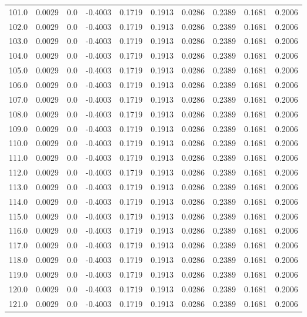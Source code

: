 \begin{longtable}{lrrrrrrrrr}
101.0 & 0.0029 & 0.0 & -0.4003 & 0.1719 & 0.1913 & 0.0286 & 0.2389 & 0.1681 & 0.2006 \\
102.0 & 0.0029 & 0.0 & -0.4003 & 0.1719 & 0.1913 & 0.0286 & 0.2389 & 0.1681 & 0.2006 \\
103.0 & 0.0029 & 0.0 & -0.4003 & 0.1719 & 0.1913 & 0.0286 & 0.2389 & 0.1681 & 0.2006 \\
104.0 & 0.0029 & 0.0 & -0.4003 & 0.1719 & 0.1913 & 0.0286 & 0.2389 & 0.1681 & 0.2006 \\
105.0 & 0.0029 & 0.0 & -0.4003 & 0.1719 & 0.1913 & 0.0286 & 0.2389 & 0.1681 & 0.2006 \\
106.0 & 0.0029 & 0.0 & -0.4003 & 0.1719 & 0.1913 & 0.0286 & 0.2389 & 0.1681 & 0.2006 \\
107.0 & 0.0029 & 0.0 & -0.4003 & 0.1719 & 0.1913 & 0.0286 & 0.2389 & 0.1681 & 0.2006 \\
108.0 & 0.0029 & 0.0 & -0.4003 & 0.1719 & 0.1913 & 0.0286 & 0.2389 & 0.1681 & 0.2006 \\
109.0 & 0.0029 & 0.0 & -0.4003 & 0.1719 & 0.1913 & 0.0286 & 0.2389 & 0.1681 & 0.2006 \\
110.0 & 0.0029 & 0.0 & -0.4003 & 0.1719 & 0.1913 & 0.0286 & 0.2389 & 0.1681 & 0.2006 \\
111.0 & 0.0029 & 0.0 & -0.4003 & 0.1719 & 0.1913 & 0.0286 & 0.2389 & 0.1681 & 0.2006 \\
112.0 & 0.0029 & 0.0 & -0.4003 & 0.1719 & 0.1913 & 0.0286 & 0.2389 & 0.1681 & 0.2006 \\
113.0 & 0.0029 & 0.0 & -0.4003 & 0.1719 & 0.1913 & 0.0286 & 0.2389 & 0.1681 & 0.2006 \\
114.0 & 0.0029 & 0.0 & -0.4003 & 0.1719 & 0.1913 & 0.0286 & 0.2389 & 0.1681 & 0.2006 \\
115.0 & 0.0029 & 0.0 & -0.4003 & 0.1719 & 0.1913 & 0.0286 & 0.2389 & 0.1681 & 0.2006 \\
116.0 & 0.0029 & 0.0 & -0.4003 & 0.1719 & 0.1913 & 0.0286 & 0.2389 & 0.1681 & 0.2006 \\
117.0 & 0.0029 & 0.0 & -0.4003 & 0.1719 & 0.1913 & 0.0286 & 0.2389 & 0.1681 & 0.2006 \\
118.0 & 0.0029 & 0.0 & -0.4003 & 0.1719 & 0.1913 & 0.0286 & 0.2389 & 0.1681 & 0.2006 \\
119.0 & 0.0029 & 0.0 & -0.4003 & 0.1719 & 0.1913 & 0.0286 & 0.2389 & 0.1681 & 0.2006 \\
120.0 & 0.0029 & 0.0 & -0.4003 & 0.1719 & 0.1913 & 0.0286 & 0.2389 & 0.1681 & 0.2006 \\
121.0 & 0.0029 & 0.0 & -0.4003 & 0.1719 & 0.1913 & 0.0286 & 0.2389 & 0.1681 & 0.2006 \\

\end{longtable}
